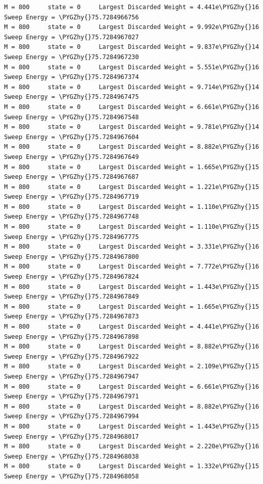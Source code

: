 \documentclass[letterpaper,10pt,english]{sphinxmanual}
\def\PYGZhy{\char`\-}
\begin{document}
\begin{Verbatim}[commandchars=\\\{\}]
M = 800     state = 0     Largest Discarded Weight = 4.441e\PYGZhy{}16  Sweep Energy = \PYGZhy{}75.7284966756
M = 800     state = 0     Largest Discarded Weight = 9.992e\PYGZhy{}16  Sweep Energy = \PYGZhy{}75.7284967027
M = 800     state = 0     Largest Discarded Weight = 9.837e\PYGZhy{}14  Sweep Energy = \PYGZhy{}75.7284967230
M = 800     state = 0     Largest Discarded Weight = 5.551e\PYGZhy{}16  Sweep Energy = \PYGZhy{}75.7284967374
M = 800     state = 0     Largest Discarded Weight = 9.714e\PYGZhy{}14  Sweep Energy = \PYGZhy{}75.7284967475
M = 800     state = 0     Largest Discarded Weight = 6.661e\PYGZhy{}16  Sweep Energy = \PYGZhy{}75.7284967548
M = 800     state = 0     Largest Discarded Weight = 9.781e\PYGZhy{}14  Sweep Energy = \PYGZhy{}75.7284967604
M = 800     state = 0     Largest Discarded Weight = 8.882e\PYGZhy{}16  Sweep Energy = \PYGZhy{}75.7284967649
M = 800     state = 0     Largest Discarded Weight = 1.665e\PYGZhy{}15  Sweep Energy = \PYGZhy{}75.7284967687
M = 800     state = 0     Largest Discarded Weight = 1.221e\PYGZhy{}15  Sweep Energy = \PYGZhy{}75.7284967719
M = 800     state = 0     Largest Discarded Weight = 1.110e\PYGZhy{}15  Sweep Energy = \PYGZhy{}75.7284967748
M = 800     state = 0     Largest Discarded Weight = 1.110e\PYGZhy{}15  Sweep Energy = \PYGZhy{}75.7284967775
M = 800     state = 0     Largest Discarded Weight = 3.331e\PYGZhy{}16  Sweep Energy = \PYGZhy{}75.7284967800
M = 800     state = 0     Largest Discarded Weight = 7.772e\PYGZhy{}16  Sweep Energy = \PYGZhy{}75.7284967824
M = 800     state = 0     Largest Discarded Weight = 1.443e\PYGZhy{}15  Sweep Energy = \PYGZhy{}75.7284967849
M = 800     state = 0     Largest Discarded Weight = 1.665e\PYGZhy{}15  Sweep Energy = \PYGZhy{}75.7284967873
M = 800     state = 0     Largest Discarded Weight = 4.441e\PYGZhy{}16  Sweep Energy = \PYGZhy{}75.7284967898
M = 800     state = 0     Largest Discarded Weight = 8.882e\PYGZhy{}16  Sweep Energy = \PYGZhy{}75.7284967922
M = 800     state = 0     Largest Discarded Weight = 2.109e\PYGZhy{}15  Sweep Energy = \PYGZhy{}75.7284967947
M = 800     state = 0     Largest Discarded Weight = 6.661e\PYGZhy{}16  Sweep Energy = \PYGZhy{}75.7284967971
M = 800     state = 0     Largest Discarded Weight = 8.882e\PYGZhy{}16  Sweep Energy = \PYGZhy{}75.7284967994
M = 800     state = 0     Largest Discarded Weight = 1.443e\PYGZhy{}15  Sweep Energy = \PYGZhy{}75.7284968017
M = 800     state = 0     Largest Discarded Weight = 2.220e\PYGZhy{}16  Sweep Energy = \PYGZhy{}75.7284968038
M = 800     state = 0     Largest Discarded Weight = 1.332e\PYGZhy{}15  Sweep Energy = \PYGZhy{}75.7284968058

\end{Verbatim}
\end{document}
